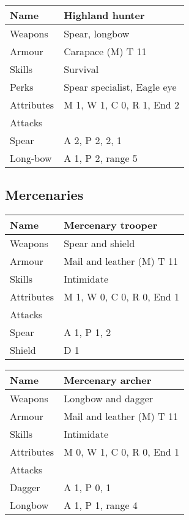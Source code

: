 \documentclass[a4paper,11pt,oneside]{book}
\newcommand{\textlf}[1]{\textbf{\titlecap{#1}}}
\begin{document}
\begin{tabular}{|l|l|}
	\hline
	Name & Highland hunter\\
	\hline
	Weapons & Spear, longbow\\
	Armour & Carapace (M) T 11\\
	Skills & Survival\\
	Perks & Spear specialist, Eagle eye \\
	Attributes & M 1, W 1, C 0, R 1, End 2\\ 
	\hline
	Attacks & \\
	\hline
	Spear & A 2, P 2, \textlf{Rending} 2, \textlf{Defence} 1 \\
	Long-bow & A 1, P 2, range 5\\
	\hline
\end{tabular}

\subsection{Mercenaries}

\begin{tabular}{|l|l|}
	\hline
	Name & Mercenary trooper\\
	\hline
	Weapons & Spear and shield\\
	Armour & Mail and leather (M) T 11\\
	Skills & Intimidate\\
	Attributes & M 1, W 0, C 0, R 0, End 1\\
	\hline
	Attacks & \\
	\hline
 	Spear & A 1, P 1, \textlf{Rending} 2\\
	Shield & D 1\\
	\hline
\end{tabular}

\begin{tabular}{|l|l|}
	\hline
	Name & Mercenary archer\\
	\hline
	Weapons & Longbow and dagger\\
	Armour & Mail and leather (M) T 11\\
	Skills & Intimidate\\
	Attributes & M 0, W 1, C 0, R 0, End 1\\
	\hline
	Attacks & \\
	\hline
	Dagger & A 1, P 0, \textlf{Rending} 1\\
	Longbow & A 1, P 1, range 4\\
	\hline
\end{tabular}
\end{document}
